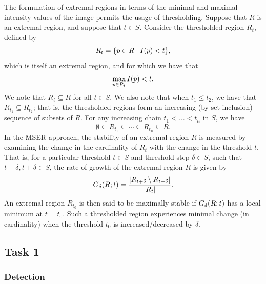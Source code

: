 \documentclass{article}
\begin{document}
The formulation of extremal regions in terms of the minimal and maximal
intensity values of the image permits the usage of thresholding.
Suppose that $R$ is an extremal region, and suppose that $t \in S$.
Consider the thresholded region $R_{t}$, defined by
\begin{equation}
  \label{eq:def-region-threshold}
  R_{t}
  =
  \lbrace
    p \in R
    \mid
    I(p) < t
  \rbrace
  ,
\end{equation}
which is itself an extremal region, and for which we have that
\begin{equation}
  \label{eq:def-region-threshold}
  \max_{p \in R_{t}} I(p)
  <
  t
  .
\end{equation}
We note that $R_{t} \subseteq R$ for all $t \in S$.
We also note that when $t_{1} \leq t_{2}$, we have that
$R_{t_{1}} \subseteq R_{t_{2}}$; that is, the thresholded regions form an
increasing (by set inclusion) sequence of subsets of $R$.
For any increasing chain $t_{1} < \dotsc < t_{n}$ in $S$, we have
\begin{equation}
  \label{eq:def-region-threshold-sequence}
  \emptyset
  \subseteq
  R_{t_{1}}
  \subseteq
  \dotsb
  \subseteq
  R_{t_{n}}
  \subseteq
  R
  .
\end{equation}
In the MSER approach, the stability of an extremal region $R$ is measured by
examining the change in the cardinality of $R_{t}$ with the change in the
threshold $t$.
That is, for a particular threshold $t \in S$ and threshold step $\delta \in S$,
such that $t - \delta, t + \delta \in S$, the rate of growth of the extremal
region $R$ is given by
\begin{equation}
  \label{eq:def-region-growth}
  G_{\delta}(R; t)
  =
  \frac
  {
    \lvert
      R_{t + \delta}
      \setminus
      R_{t - \delta}
    \rvert
  }
  {
    \lvert R_{t}\rvert
  }
  .
\end{equation}
An extremal region $R_{t_{0}}$ is then said to be maximally stable if
$G_{\delta}(R; t)$ has a local minimum at $t = t_{0}$.
Such a thresholded region experiences minimal change (in cardinality) when the
threshold $t_{0}$ is increased/decreased by $\delta$.

\subsection{Task 1}
\label{sec:implementation-1}

\subsubsection*{Detection}
\end{document}
